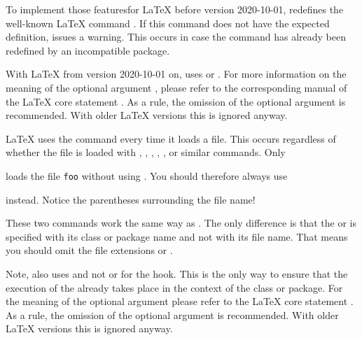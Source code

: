 To implement those featuresfor \LaTeX{} before version 2020-10-01,
 redefines the well-known \LaTeX{} command
. If this command does not have the expected
definition,  issues a warning. This occurs in
case the command has already been redefined by an incompatible package.

With \LaTeX{} from
version 2020-10-01 on,  uses
or
.
For more information on the meaning of the optional argument ,
please refer to the corresponding manual of the \LaTeX{} core statement
. As a rule, the omission of the optional argument is
recommended. With older \LaTeX{} versions this is ignored anyway.

\LaTeX{} uses the  command every time it loads a
file. This occurs regardless of whether the file is loaded with
, , , ,
, or similar commands. Only
\begin{lstcode}
  
\end{lstcode}
loads the file \texttt{foo} without using
. You should therefore always use
\begin{lstcode}
  
\end{lstcode}
instead. Notice the parentheses surrounding the file name!%
%
\EndIndexGroup


\begin{Declaration}
\end{Declaration}%
These two commands work the same way as .
The only difference is that the  or  is specified
with its class or package name and not with its file name. That means you
should omit the file extensions  or .

Note,  also uses 
and not  or  for the hook. This is the only way
to ensure that the execution of the  already takes place in
the context of the class or package. For the meaning of the optional argument
 please refer to the \LaTeX{} core statement
. As a rule, the omission of the optional
argument is recommended. With older \LaTeX{} versions this is ignored anyway.%
\EndIndexGroup


